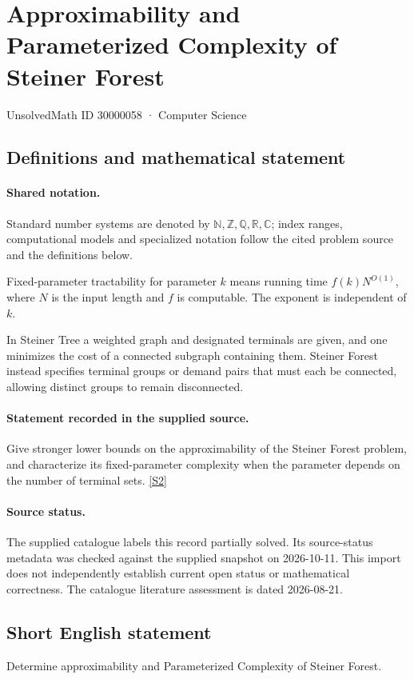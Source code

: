 \documentclass[11pt]{article}
\newcommand{\sref}[2]{\hyperlink{source:#1:#2}{[S#2]}}
\begin{document}
\setcounter{section}{30000057}
\section{Approximability and Parameterized Complexity of Steiner Forest}\label{30000058}
{\small\sffamily UnsolvedMath ID 30000058 · Computer Science}
\subsection{Definitions and mathematical statement}

\paragraph{Shared notation.}Standard number systems are denoted by $\mathbb N,\mathbb Z,\mathbb Q,\mathbb R,\mathbb C$; index ranges, computational models and specialized notation follow the cited problem source and the definitions below.


Fixed-parameter tractability for parameter $k$ means running time $f(k)N^{O(1)}$, where $N$ is the input length and $f$ is computable. The exponent is independent of $k$.

In Steiner Tree a weighted graph and designated terminals are given, and one minimizes the cost of a connected subgraph containing them. Steiner Forest instead specifies terminal groups or demand pairs that must each be connected, allowing distinct groups to remain disconnected.
\paragraph{Statement recorded in the supplied source.}
Give stronger lower bounds on the approximability of the Steiner Forest problem, and characterize its fixed-parameter complexity when the parameter depends on the number of terminal sets. \sref{30000058}{2}
\paragraph{Source status.}
The supplied catalogue labels this record partially solved. Its source-status metadata was checked against the supplied snapshot on 2026-10-11. This import does not independently establish current open status or mathematical correctness. The catalogue literature assessment is dated 2026-08-21.
\subsection{Short English statement}
Determine approximability and Parameterized Complexity of Steiner Forest.
\end{document}
